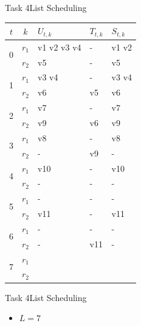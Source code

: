 \begin{frame}{Task 4}{List Scheduling}
  \begin{solutionnoinc}
    \centering
    \tiny
    \begin{tabular}{c|c|l|l|l|}
    \hline$t$ & $k$ & $U_{t, k}$ & $T_{t, k}$ & $S_{t, k}$ \\
    \hline \multirow{2}{*}{0} & $r_1$ & v1 v2 v3 v4 & - & v1 v2 \\
    \cline { 2 - 5 } & $r_2$ & v5 & - & v5 \\
    \hline \multirow{2}{*}{1} & $r_1$ & v3 v4 & - & v3 v4 \\
    \cline { 2 - 5 } & $r_2$ & v6 & v5 & v6 \\
    \hline \multirow{2}{*}{2} & $r_1$ & v7 & - & v7 \\
    \cline { 2 - 5 } & $r_2$ & v9 & v6 & v9 \\
    \hline \multirow{2}{*}{3} & $r_1$ & v8 & - & v8 \\
    \cline { 2 - 5 } & $r_2$ & - & v9 & - \\
    \hline \multirow{2}{*}{4} & $r_1$ & v10 & - & v10 \\
    \cline { 2 - 5 }  & $r_2$ & - & - & - \\
    \hline \multirow{2}{*}{5} & $r_1$ & - & - & - \\
    \cline { 2 - 5 } & $r_2$ & v11 & - & v11 \\
    \hline \multirow{2}{*}{6} & $r_1$ & - & - & - \\
    \cline { 2 - 5 } & $r_2$ & - & v11 & - \\
    \hline \multirow{2}{*}{7} & $r_1$ & & & \\
    \cline { 2 - 5 } & $r_2$ & & & \\
    \hline
    \end{tabular}
  \end{solutionnoinc}
\end{frame}

\begin{frame}{Task 4}{List Scheduling}
  \begin{solution}
    \begin{itemize}
      \item $L=7$
    \end{itemize}
  \end{solution}
\end{frame}

